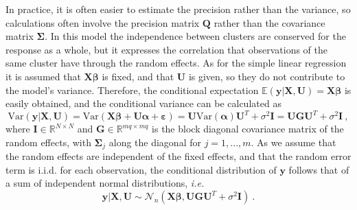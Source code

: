 In practice, it is often easier to estimate the precision rather than the variance, so calculations often involve the precision matrix $\mathbf{Q}$ rather than the covariance matrix $\mathbf{\Sigma}$.
In this model the independence between clusters are conserved for the response as a whole, but it expresses the correlation that observations of the same cluster have through the random effects.
As for the simple linear regression it is assumed that $\mathbf{X}\boldsymbol{\beta}$ is fixed, and that $\mathbf{U}$ is given, so they do not contribute to the model's variance. Therefore, the conditional expectation $\mathbb{E}(\mathbf{y} \lvert \mathbf{X}, \mathbf{U}) = \mathbf{X}\boldsymbol{\beta}$ is easily obtained, and the conditional variance can be calculated as
\begin{equation} \label{eq:cond_var_LMM}
    \text{Var}(\mathbf{y} \lvert \mathbf{X}, \mathbf{U}) = \text{Var}(\mathbf{X}\boldsymbol{\beta}  + \mathbf{U}\boldsymbol{\alpha} + \boldsymbol{\varepsilon}) = \mathbf{U}\text{Var}(\boldsymbol{\alpha})\mathbf{U}^T + \sigma^2\mathbf{I} = \mathbf{U}\mathbf{G}\mathbf{U}^T + \sigma^2\mathbf{I} \ ,
\end{equation}
where $\mathbf{I}\in \mathbb{R}^{N\times N}$ and $\mathbf{G} \in \mathbb{R}^{mq \times mq}$ is the block diagonal covariance matrix of the random effects, with $\mathbf{\Sigma}_j$ along the diagonal for $j=1, ..., m$. 
As we assume that the random effects are independent of the fixed effects, and that the random error term is i.i.d. for each observation, the conditional distribution of $\mathbf{y}$ follows that of a sum of independent normal distributions, \textit{i.e.}
\begin{equation}
    \mathbf{y} \lvert \mathbf{X}, \mathbf{U} \sim \mathcal{N}_n(\mathbf{X}\boldsymbol{\beta}, \mathbf{U}\mathbf{G}\mathbf{U}^T + \sigma^2\mathbf{I}) \ .
\end{equation}

